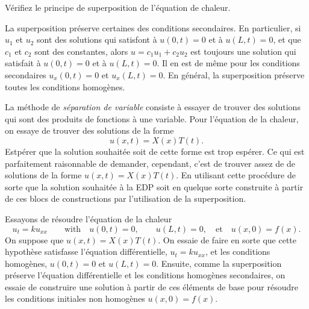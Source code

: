 \begin{exercise}
Vérifiez le principe de superposition de l'équation de chaleur.
\end{exercise}

La superposition préserve certaines des conditions secondaires.  En particulier,
si $ u_1 $ et $ u_2 $ sont des 
solutions qui satisfont à $ u (0, t) = 0 $ et à $ u (L, t) = 0 $,
et que $ c_1 $  et $ c_2 $ sont des constantes,  alors
$ u = c_1 u_1 + c_2 u_2 $ est toujours une solution
qui satisfait à $ u (0, t) = 0 $ et à  $ u (L, t) = 0 $.  Il en est de même
pour les conditions secondaires $ u_x (0, t) = 0 $ et $ u_x (L, t) = 0 $.  En général,
la superposition préserve toutes les conditions homogènes.

La méthode de 
\emph{séparation de variable} consiste à essayer de trouver des solutions qui sont des produits de fonctions à une variable.
Pour l'équation de la chaleur,  on essaye de trouver des solutions de la forme
\begin{equation*}
u(x , t) = X(x)T(t) .
\end{equation*}
Estpérer que la solution souhaitée soit de cette forme est trop
espérer.  Ce qui est parfaitement raisonnable de demander,  cependant,  c'est de trouver
assez de  de solutions de la forme
$u(x,t) = X(x)T(t)$.  En utilisant cette procédure
de sorte que la solution souhaitée à la EDP soit en quelque sorte construite à partir de ces
blocs de constructions par l'utilisation de la superposition. 

Essayons de résoudre l'équation de la chaleur
\begin{equation*}
u_t = k u_{xx}
\qquad \text{with} \quad
u(0 , t) = 0 ,\quad \quad u(L , t) = 0,
\quad \text{et} \quad u(x,0) = f(x) .
\end{equation*}
On suppose que $u(x,t) = X(x)T(t)$.  On essaie de faire en sorte que cette hypothèse satisfasse l'équation différentielle, $ u_t = k u_ {xx} $, et les conditions homogènes,
$ u (0, t) = 0 $ et $ u (L, t) = 0 $.  Ensuite,  comme la superposition préserve l'équation différentielle et les conditions homogènes secondaires,  on essaie de
construire une solution à partir de ces éléments de base pour résoudre les
conditions initiales non homogènes $ u (x, 0) = f (x) $.

